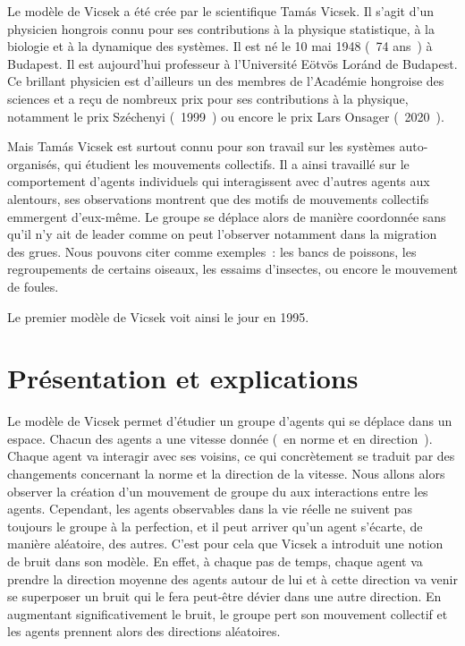 \documentclass[french, a4paper, 12pt, openany]{report}
\begin{document}
	Le modèle de Vicsek a été crée par le scientifique Tamás Vicsek. Il s'agit d'un physicien hongrois connu pour ses contributions à la physique statistique, à la biologie et à la dynamique des systèmes. Il est né le 10 mai 1948 (~74 ans~) à Budapest. Il est aujourd'hui professeur à l'Université Eötvös Loránd de Budapest. Ce brillant physicien est d'ailleurs un des membres de l'Académie hongroise des sciences et a reçu de nombreux prix pour ses contributions à la physique, notamment le prix Széchenyi (~1999~) ou encore le prix Lars Onsager (~2020~).

	Mais Tamás Vicsek est surtout connu pour son travail sur les systèmes auto-organisés, qui étudient les mouvements collectifs. Il a ainsi travaillé sur le comportement d'agents individuels qui interagissent avec d'autres agents aux alentours, ses observations montrent que des motifs de mouvements collectifs emmergent d'eux-même. Le groupe se déplace alors de manière coordonnée sans qu'il n'y ait de leader comme on peut l'observer notamment dans la migration des grues. Nous pouvons citer comme exemples~: les bancs de poissons, les regroupements de certains oiseaux, les essaims d'insectes, ou encore le mouvement de foules.

	 Le premier modèle de Vicsek voit ainsi le jour en 1995.\\
	 
	
\chapter{Présentation et explications}	

	Le modèle de Vicsek permet d'étudier un groupe d'agents qui se déplace dans un espace. Chacun des agents a une vitesse donnée (~en norme et en direction~). Chaque agent va interagir avec ses voisins, ce qui concrètement se traduit par des changements concernant la norme et la direction de la vitesse. Nous allons alors observer la création d'un mouvement de groupe du aux interactions entre les agents. Cependant, les agents observables dans la vie réelle ne suivent pas toujours le groupe à la perfection, et il peut arriver qu'un agent s'écarte, de manière aléatoire, des autres. C'est pour cela que Vicsek a introduit une notion de bruit dans son modèle. En effet, à chaque pas de temps, chaque agent va prendre la direction moyenne des agents autour de lui et à cette direction va venir se superposer un bruit qui le fera peut-être dévier dans une autre direction. En augmentant significativement le bruit, le groupe pert son mouvement collectif et les agents prennent alors des directions aléatoires.\\
\end{document}
